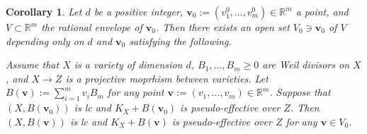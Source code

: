 \documentclass[11pt]{amsart}
\numberwithin{equation}{section}
\newcommand{\Rr}{\mathbb{R}}
\newtheorem{cor}[thm]{Corollary}
\theoremstyle{definition}
\theoremstyle{definition}
\begin{document}
\begin{cor}\label{thm: Uniform pe polytope}
Let $d$ be a positive integer, $\bm{v}_0:=(v^0_1,\ldots,v^0_m)\in\Rr^m$ a point, and $V\subset\Rr^m$ the rational envelope of $\bm{v}_0$. Then there exists an open set $V_0\ni\bm{v}_0$ of $V$ depending only on $d$ and $\bm{v}_0$ satisfying the following. 

Assume that $X$ is a variety of dimension $d$, $B_1,\dots,B_m\geq 0$ are Weil divisors on $X$, and $X\to Z$ is a projective moprhism between varieties. Let $B(\bm{v}):=\sum_{i=1}^mv_iB_m$ for any point $\bm{v}:=(v_1,\dots,v_m)\in\Rr^m$. Suppose that $(X,B(\bm{v}_0))$ is lc and $K_X+B(\bm{v}_0)$ is pseudo-effective over $Z$. Then $(X,B(\bm{v}))$ is lc and $K_X+B(\bm{v})$ is pseudo-effective over $Z$ for any $\bm{v}\in V_0$.
\end{cor}
\end{document}
